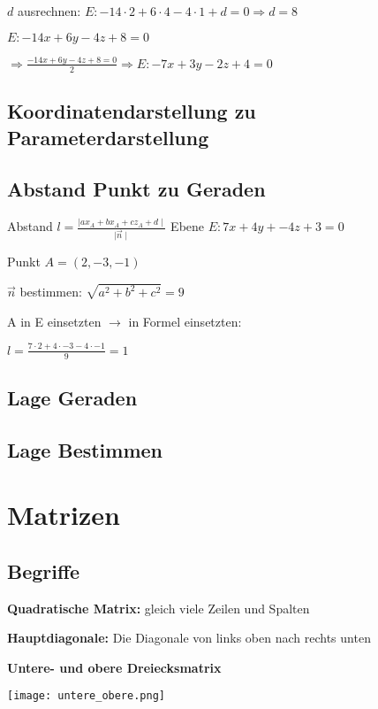 \begin{multicols*}{3}
     $d$ ausrechnen: $ E: -14 \cdot 2  + 6 \cdot 4 - 4\cdot 1 + d = 0 \Rightarrow d = 8$

     $E: -14x + 6y - 4z + 8 = 0$

    $\Rightarrow \frac{-14x + 6y - 4z + 8 = 0}{2} \Rightarrow E: -7x + 3y - 2z + 4 = 0$

    \subsection{Koordinatendarstellung zu Parameterdarstellung }


    \subsection{Abstand Punkt zu Geraden}
    {Abstand \Large $  l = \frac{\mid ax_A + bx_A + cz_A + d  \mid}{\mid \vec{n} \mid}$ }
    {Ebene $E:  7x+4y+-4z+3=0 $}

    {Punkt $A = (2,-3,-1)$}


    { $\vec{n}$ bestimmen: $\sqrt{a^2+b^2+c^2} = 9$}

    { A in E einsetzten $ \rightarrow $ in Formel einsetzten: }

    {$l = \frac{7 \cdot 2 + 4 \cdot -3 -4 \cdot -1}{9} = 1$}

    \subsection{Lage Geraden}

    \subsection{Lage Bestimmen}


    \section{Matrizen}
    \subsection{Begriffe}

    \textbf{Quadratische Matrix:} gleich viele Zeilen und Spalten

    \textbf{Hauptdiagonale:} Die Diagonale von links oben nach rechts unten

    \textbf{Untere- und obere Dreiecksmatrix}

    \texttt{[image: untere\_obere.png]}


\end{multicols*}
